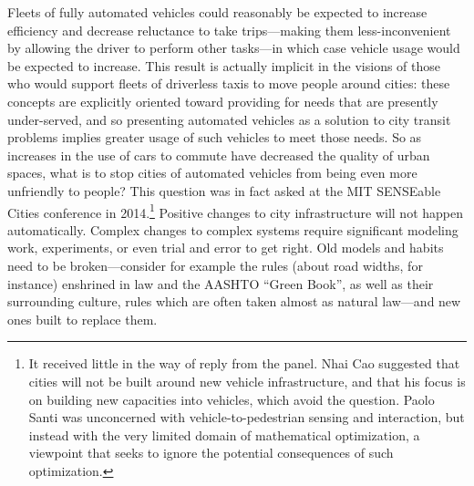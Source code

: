Fleets of fully automated vehicles could reasonably be expected to increase
efficiency and decrease reluctance to take trips---making them
less-inconvenient by allowing the driver to perform other tasks---in
which case vehicle usage would be expected to increase. This result is actually
implicit in the visions of those who would support fleets of
driverless taxis to move people around cities:  these concepts are
explicitly oriented toward providing for needs that are presently
under-served, and so presenting automated vehicles as a solution to
city transit problems implies greater usage of such vehicles to meet
those needs. So as increases in the use of cars to commute have
decreased the quality of urban spaces, what is to stop cities of
automated vehicles from
being even more unfriendly to
people? This question was in fact asked at the MIT SENSEable Cities
conference in 2014.\footnote{It received little in the way of reply from the
panel. Nhai Cao suggested that cities will not be built around new
vehicle infrastructure, and that his focus is on building new
capacities into vehicles, which avoid the question. Paolo Santi was
unconcerned with vehicle-to-pedestrian sensing and interaction, but
instead with the very limited domain of mathematical optimization,
a viewpoint that seeks to ignore the potential consequences of such
optimization.} Positive changes to city infrastructure will not happen
automatically. Complex
changes to complex systems require significant modeling work,
experiments, or even trial and error to get right. Old models and
habits need to be broken---consider for example the rules (about road
widths, for instance) enshrined in law and the AASHTO ``Green Book'', as well as their
surrounding culture, rules which are often taken almost as natural
law\cite[p. 181, 183]{swopeTrenton}---and new ones built to replace them. 

